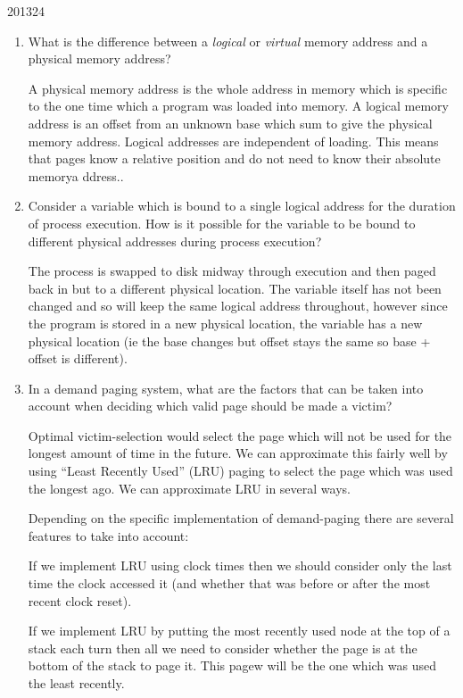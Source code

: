 \documentclass[10pt,\jkfside,a4paper]{article}
\begin{document}
\begin{examquestion}{2013}{2}{4}

\begin{enumerate}

\item What is the difference between a \textit{logical} or \textit{virtual} memory 
address and a physical memory address?

A physical memory address is the whole address in memory which is specific to the one time 
which a program was loaded into memory. A logical memory address 
is an offset from an unknown base which sum to give the physical memory address. Logical 
addresses are independent of loading. This means that pages know a relative position and do not 
need to know their absolute memorya ddress..

\item Consider a variable which is bound to a single logical address for the duration
of process execution. How is it possible for the variable to be bound to different
physical addresses during process execution?

The process is swapped to disk midway through execution and then paged back in but 
to a different physical location. The variable itself has not been changed and so will keep the 
same logical address throughout, however since the program is stored in a new physical 
location, the variable has a new physical location (ie the base changes but offset 
stays the same so base + offset is different).

\item In a demand paging system, what are the factors that can be taken into account
when deciding which valid page should be made a victim?

Optimal victim-selection would select the page which will not be used for the longest amount of 
time in the future. We can approximate this fairly well by using ``Least Recently Used'' (LRU) 
paging to select the page which was used the longest ago. We can approximate LRU in several ways.

Depending on the specific implementation of demand-paging there are several features to take into account:

If we implement LRU using clock times then we should consider only the last time the clock accessed it 
(and whether that was before or after the most recent clock reset).

If we implement LRU by putting the most recently used node at the top of a stack each turn then all we need 
to consider whether the page is at the bottom of the stack to page it. This pagew will be the 
one which was used the least recently.


\end{enumerate}
\end{examquestion}
\end{document}

